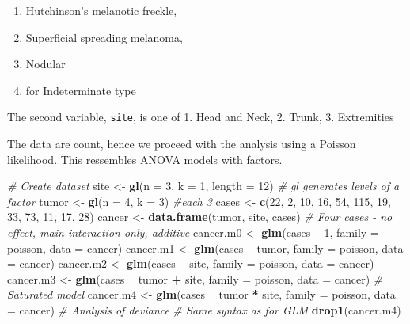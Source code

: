 \documentclass[]{book}
\newenvironment{Shaded}{\begin{snugshade}}{\end{snugshade}}
\newcommand{\CommentTok}[1]{\textcolor[rgb]{0.56,0.35,0.01}{\textit{#1}}}
\newcommand{\DataTypeTok}[1]{\textcolor[rgb]{0.13,0.29,0.53}{#1}}
\newcommand{\DecValTok}[1]{\textcolor[rgb]{0.00,0.00,0.81}{#1}}
\newcommand{\KeywordTok}[1]{\textcolor[rgb]{0.13,0.29,0.53}{\textbf{#1}}}
\newcommand{\NormalTok}[1]{#1}
\newcommand{\OperatorTok}[1]{\textcolor[rgb]{0.81,0.36,0.00}{\textbf{#1}}}
\newcommand{\StringTok}[1]{\textcolor[rgb]{0.31,0.60,0.02}{#1}}
\providecommand{\tightlist}{%
  \setlength{\itemsep}{0pt}\setlength{\parskip}{0pt}}
\theoremstyle{definition}
\theoremstyle{definition}
\theoremstyle{definition}
\theoremstyle{remark}
\begin{document}
\begin{enumerate}
\def\labelenumi{\arabic{enumi}.}
\tightlist
\item
  Hutchinson's melanotic freckle,
\item
  Superficial spreading melanoma,
\item
  Nodular
\item
  for Indeterminate type
\end{enumerate}

The second variable, \texttt{site}, is one of
1. Head and Neck,
2. Trunk,
3. Extremities

The data are count, hence we proceed with the analysis using a Poisson likelihood. This ressembles ANOVA models with factors.

\begin{Shaded}
\begin{Highlighting}[]
\CommentTok{# Create dataset}
\NormalTok{site <-}\StringTok{ }\KeywordTok{gl}\NormalTok{(}\DataTypeTok{n =} \DecValTok{3}\NormalTok{, }\DataTypeTok{k =} \DecValTok{1}\NormalTok{, }\DataTypeTok{length =} \DecValTok{12}\NormalTok{) }
\CommentTok{# gl generates levels of a factor}
\NormalTok{tumor <-}\StringTok{ }\KeywordTok{gl}\NormalTok{(}\DataTypeTok{n =} \DecValTok{4}\NormalTok{, }\DataTypeTok{k =} \DecValTok{3}\NormalTok{) }\CommentTok{#each 3}
\NormalTok{cases <-}\StringTok{ }\KeywordTok{c}\NormalTok{(}\DecValTok{22}\NormalTok{, }\DecValTok{2}\NormalTok{, }\DecValTok{10}\NormalTok{, }\DecValTok{16}\NormalTok{, }\DecValTok{54}\NormalTok{, }\DecValTok{115}\NormalTok{, }\DecValTok{19}\NormalTok{, }\DecValTok{33}\NormalTok{, }\DecValTok{73}\NormalTok{, }\DecValTok{11}\NormalTok{, }\DecValTok{17}\NormalTok{, }\DecValTok{28}\NormalTok{)}
\NormalTok{cancer <-}\StringTok{ }\KeywordTok{data.frame}\NormalTok{(tumor, site, cases)}
\CommentTok{# Four cases - no effect, main interaction only, additive}
\NormalTok{cancer.m0 <-}\StringTok{ }\KeywordTok{glm}\NormalTok{(cases }\OperatorTok{~}\StringTok{ }\DecValTok{1}\NormalTok{, }\DataTypeTok{family =}\NormalTok{ poisson, }\DataTypeTok{data =}\NormalTok{ cancer)}
\NormalTok{cancer.m1 <-}\StringTok{ }\KeywordTok{glm}\NormalTok{(cases }\OperatorTok{~}\StringTok{ }\NormalTok{tumor, }\DataTypeTok{family =}\NormalTok{ poisson, }\DataTypeTok{data =}\NormalTok{ cancer)}
\NormalTok{cancer.m2 <-}\StringTok{ }\KeywordTok{glm}\NormalTok{(cases }\OperatorTok{~}\StringTok{ }\NormalTok{site, }\DataTypeTok{family =}\NormalTok{ poisson, }\DataTypeTok{data =}\NormalTok{ cancer)}
\NormalTok{cancer.m3 <-}\StringTok{ }\KeywordTok{glm}\NormalTok{(cases }\OperatorTok{~}\StringTok{ }\NormalTok{tumor }\OperatorTok{+}\StringTok{ }\NormalTok{site, }\DataTypeTok{family =}\NormalTok{ poisson, }\DataTypeTok{data =}\NormalTok{ cancer)}
\CommentTok{# Saturated model}
\NormalTok{cancer.m4 <-}\StringTok{ }\KeywordTok{glm}\NormalTok{(cases }\OperatorTok{~}\StringTok{ }\NormalTok{tumor }\OperatorTok{*}\StringTok{ }\NormalTok{site, }\DataTypeTok{family =}\NormalTok{ poisson, }\DataTypeTok{data =}\NormalTok{ cancer)}
\CommentTok{# Analysis of deviance}
\CommentTok{# Same syntax as for GLM}
\KeywordTok{drop1}\NormalTok{(cancer.m4)}
\end{Highlighting}
\end{Shaded}
\end{document}
